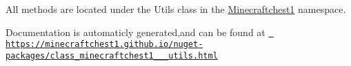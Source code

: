 All methods are located under the {\ttfamily Utils} class in the {\ttfamily \mbox{\hyperlink{namespace_minecraftchest1}{Minecraftchest1}}} namespace.

Documentation is automaticly generated,and can be found at \href{https://minecraftchest1.github.io/nuget-packages/class_minecraftchest1_1_1_utils.html}{\texttt{ https\+://minecraftchest1.\+github.\+io/nuget-\/packages/class\+\_\+minecraftchest1\+\_\+\_\+\_\+utils.\+html}} 
